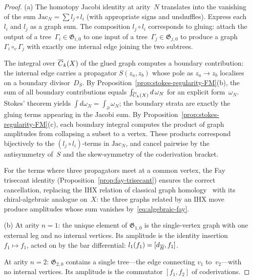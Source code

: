 \begin{proof}
(a)\enspace
The homotopy Jacobi identity at arity~$N$ translates into the
vanishing of the sum
$\mathrm{Jac}_N = \sum l_j \circ l_i$
(with appropriate signs and unshuffles).
Express each $l_i$ and $l_j$ as a graph sum.  The composition
$l_j \circ l_i$ corresponds to gluing: attach the output of a
tree~$\Gamma_i \in \mathfrak{G}_{i,0}$ to one input of a
tree~$\Gamma_j \in \mathfrak{G}_{j,0}$ to produce a graph
$\Gamma_i \circ_v \Gamma_j$ with exactly one internal edge
joining the two subtrees.

The integral over $\overline{C}_{k}(X)$ of the
glued graph computes a boundary contribution: the internal edge
carries a propagator $S(z_a, z_b)$ whose pole as
$z_a \to z_b$ localises on a boundary divisor~$D_S$.
By Proposition~\ref{prop:stokes-regularity-FM}(b), the sum of
all boundary contributions equals
$\int_{\overline{C}_{k}(X)} d\,\omega_N$ for an explicit
form~$\omega_N$.  Stokes' theorem yields
$\int d\omega_N = \int_\partial \omega_N$; the boundary strata
are exactly the gluing terms appearing in the Jacobi sum.
By Proposition~\ref{prop:stokes-regularity-FM}(c), each boundary
integral computes the product of graph amplitudes from collapsing
a subset to a vertex.  These products correspond bijectively to the
$(l_j \circ l_i)$-terms in $\mathrm{Jac}_N$, and cancel pairwise
by the antisymmetry of~$S$ and the skew-symmetry of the coderivation
bracket.

For the terms where three propagators meet at a common vertex, the
Fay trisecant identity
(Proposition~\ref{prop:fay-trisecant}) ensures the correct
cancellation, replacing the IHX relation of classical graph
homology~\cite{LV12} with its chiral-algebraic analogue on~$X$:
the three graphs related by an IHX move produce amplitudes whose sum
vanishes by~\eqref{eq:algebraic-fay}.

(b)\enspace
At arity $n = 1$: the unique element of $\mathfrak{G}_{1,0}$ is the
single-vertex graph with one external leg and no internal vertices.
Its amplitude is the identity insertion $f_1 \mapsto f_1$, acted on
by the bar differential: $l_1(f_1) = [d_{\overline{B}}, f_1]$.

At arity $n = 2$: $\mathfrak{G}_{2,0}$ contains a single tree---the
edge connecting $v_1$ to~$v_2$---with no internal vertices.  Its
amplitude is the commutator $[f_1, f_2]$ of coderivations.


\end{proof}
